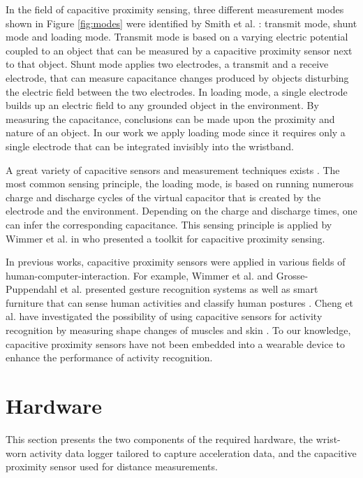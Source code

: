 \documentclass[runningheads,a4paper]{llncs}
\begin{document}
In the field of capacitive proximity sensing, three different measurement modes shown in Figure \ref{fig:modes} were identified by Smith et al. \cite{Smith1999}: transmit mode, shunt mode and loading mode. Transmit mode is based on a varying electric potential coupled to an object that can be measured by a capacitive proximity sensor next to that object. Shunt mode applies two electrodes, a transmit and a receive electrode, that can measure capacitance changes produced by objects disturbing the electric field between the two electrodes. In loading mode, a single electrode builds up an electric field to any grounded object in the environment. By measuring the capacitance, conclusions can be made upon the proximity and nature of an object. In our work we apply loading mode since it requires only a single electrode that can be integrated invisibly into the wristband.

A great variety of capacitive sensors and measurement techniques exists \cite{Smith1999}. The most common sensing principle, the loading mode, is based on running numerous charge and discharge cycles of the virtual capacitor that is created by the electrode and the environment. Depending on the charge and discharge times, one can infer the corresponding capacitance. This sensing principle is applied by Wimmer et al. in \cite{Wimmer2007} who presented a toolkit for capacitive proximity sensing.

In previous works, capacitive proximity sensors were applied in various fields of human-computer-interaction. For example, Wimmer et al. and Grosse-Puppendahl et al. presented gesture recognition systems \cite{Wimmer,Grosse-puppendahl2012} as well as smart furniture that can sense human activities \cite{Wimmer} and classify human postures \cite{Grosse-puppendahl2011}. Cheng et al. have investigated the possibility of using capacitive sensors for activity recognition by measuring shape changes of muscles and skin \cite{Cheng2010}. To our knowledge, capacitive proximity sensors have not been embedded into a wearable device to enhance the performance of activity recognition.


\section{Hardware}
\label{sect:hardware}
This section presents the two components of the required hardware, the wrist-worn activity data logger tailored to capture acceleration data, and the capacitive proximity sensor used for distance measurements.
\end{document}
